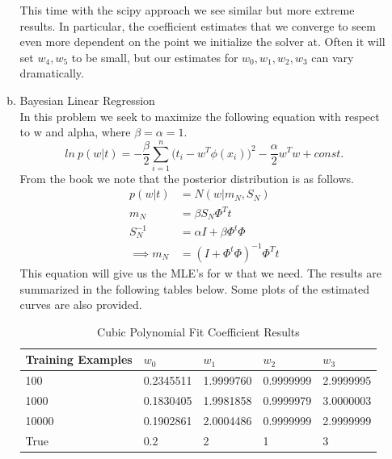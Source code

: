 \documentclass[12pt]{article}
\begin{document}
\begin{enumerate}
\begin{enumerate}[(a)]
		This time with the scipy approach we see similar but more extreme results. In particular, the coefficient estimates that we converge to seem even more dependent on the point we initialize the solver at. Often it will set $w_4, w_5$ to be small, but our estimates for $w_0,w_1, w_2, w_3$ can vary dramatically. 
		
		\item Bayesian Linear Regression \\
		In this problem we seek to maximize the following equation with respect to w and alpha, where $\beta=\alpha = 1$. 
		\begin{equation*}
		ln\ p(w|t) = -\frac{\beta}{2} \sum_{i=1}^{n} \bigg(t_i - w^T\phi(x_i)\bigg)^2 - \frac{\alpha}{2}w^Tw + const.
		\end{equation*}
		From the book we note that the posterior distribution is as follows.
		\begin{align*}
		p(w|t) &= N(w|m_N, S_N) \\
		m_N &= \beta S_N\Phi^Tt \\
		S_N^{-1} &= \alpha I + \beta \Phi^t\Phi \\
		\implies m_N &= (I + \Phi^t\Phi)^{-1}\Phi^T t
		\end{align*}
		This equation will give us the MLE's for w that we need. The results are summarized in the following tables below. Some plots of the estimated curves are also provided.
		
		\begin{table}[htb]
			\centering
			\begin{tabular}{|l|l|l|l|l|}
				\hline
				Training Examples & $w_0$     & $w_1$     & $w_2$     & $w_3$     \\ \hline
				100               & 0.2345511 & 1.9999760 & 0.9999999 & 2.9999995 \\ \hline
				1000              & 0.1830405 & 1.9981858 & 0.9999979 & 3.0000003 \\ \hline
				10000             & 0.1902861 & 2.0004486 & 0.9999999 & 2.9999999 \\ \hline
				True & 0.2 & 2 & 1 & 3 \\ \hline
			\end{tabular}
			\caption{Cubic Polynomial Fit Coefficient Results} \label{tab:sometab}
		\end{table}
	

\end{enumerate}
\end{enumerate}
\end{document}
